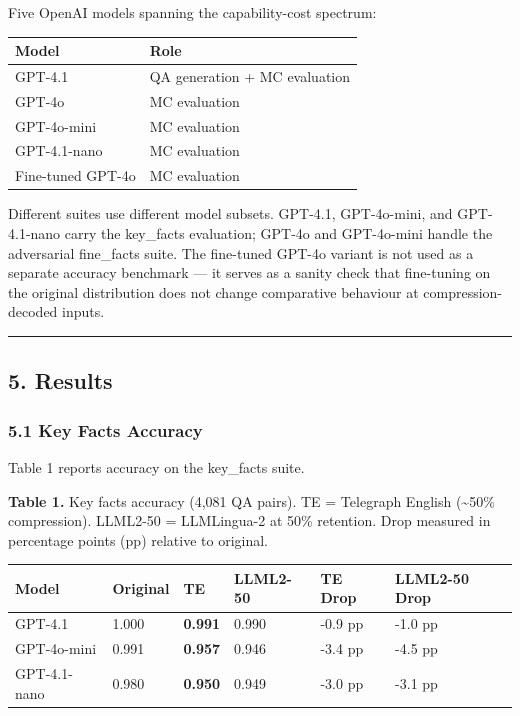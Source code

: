 \documentclass[
]{article}
\newcounter{none} %
\begin{document}
Five OpenAI models spanning the capability-cost spectrum:

{\def\LTcaptype{none} %
\begin{longtable}[]{@{}ll@{}}
\toprule\noalign{}
Model & Role \\
\midrule\noalign{}
\endhead
\bottomrule\noalign{}
\endlastfoot
GPT-4.1 & QA generation + MC evaluation \\
GPT-4o & MC evaluation \\
GPT-4o-mini & MC evaluation \\
GPT-4.1-nano & MC evaluation \\
Fine-tuned GPT-4o & MC evaluation \\
\end{longtable}
}

Different suites use different model subsets. GPT-4.1, GPT-4o-mini, and
GPT-4.1-nano carry the key\_facts evaluation; GPT-4o and GPT-4o-mini
handle the adversarial fine\_facts suite. The fine-tuned GPT-4o variant
is not used as a separate accuracy benchmark --- it serves as a sanity
check that fine-tuning on the original distribution does not change
comparative behaviour at compression-decoded inputs.

\begin{center}\rule{0.5\linewidth}{0.5pt}\end{center}

\subsection{5. Results}\label{results}

\subsubsection{5.1 Key Facts Accuracy}\label{key-facts-accuracy}

Table 1 reports accuracy on the key\_facts suite.

\textbf{Table 1.} Key facts accuracy (4,081 QA pairs). TE = Telegraph
English (\textasciitilde50\% compression). LLML2-50 = LLMLingua-2 at
50\% retention. Drop measured in percentage points (pp) relative to
original.

{\def\LTcaptype{none} %
\begin{longtable}[]{@{}llllll@{}}
\toprule\noalign{}
Model & Original & TE & LLML2-50 & TE Drop & LLML2-50 Drop \\
\midrule\noalign{}
\endhead
\bottomrule\noalign{}
\endlastfoot
GPT-4.1 & 1.000 & \textbf{0.991} & 0.990 & -0.9 pp & -1.0 pp \\
GPT-4o-mini & 0.991 & \textbf{0.957} & 0.946 & -3.4 pp & -4.5 pp \\
GPT-4.1-nano & 0.980 & \textbf{0.950} & 0.949 & -3.0 pp & -3.1 pp \\
\end{longtable}
}
\end{document}
